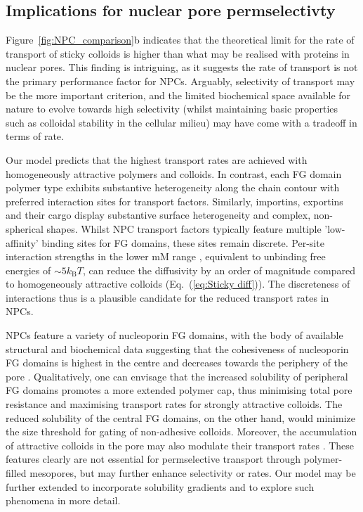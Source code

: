 \documentclass[12pt, a4paper]{article}
\begin{document}
\subsection{Implications for nuclear pore permselectivty}

Figure~\ref{fig:NPC_comparison}b indicates that the theoretical limit for the rate of transport of sticky colloids is higher than what may be realised with proteins in nuclear pores.
This finding is intriguing, as it suggests the rate of transport is not the primary performance factor for NPCs.
Arguably, selectivity of transport may be the more important criterion, and the limited biochemical space available for nature to evolve towards high selectivity (whilst maintaining basic properties such as colloidal stability in the cellular milieu) may have come with a tradeoff in terms of rate.

Our model predicts that the highest transport rates are achieved with homogeneously attractive polymers and colloids.
In contrast, each FG domain polymer type exhibits substantive heterogeneity along the chain contour with preferred interaction sites for transport factors.
Similarly, importins, exportins and their cargo display substantive surface heterogeneity and complex, non-spherical shapes.
Whilst NPC transport factors typically feature multiple 'low-affinity' binding sites for FG domains, these sites remain discrete.
Per-site interaction strengths in the lower mM range \cite{Hough2015, Milles2015, Hoogenboom2021}, equivalent to unbinding free energies of $\sim 5 k_\text{B}T$, can reduce the diffusivity by an order of magnitude compared to homogeneously attractive colloids (Eq.~(\ref{eq:Sticky diff})).
The discreteness of interactions thus is a plausible candidate for the reduced transport rates in NPCs. 

NPCs feature a variety of nucleoporin FG domains, with the body of available structural and biochemical data suggesting that the cohesiveness of nucleoporin FG domains is highest in the centre and decreases towards the periphery of the pore \cite{Hoogenboom2021, Ng2023}.
Qualitatively, one can envisage that the increased solubility of peripheral FG domains promotes a more extended polymer cap, thus minimising total pore resistance and maximising transport rates for strongly attractive colloids.
The reduced solubility of the central FG domains, on the other hand, would minimize the size threshold for gating of non-adhesive colloids.
Moreover, the accumulation of attractive colloids in the pore may also modulate their transport rates \cite{Zheng2023}.
These features clearly are not essential for permselective transport through polymer-filled mesopores, but may further enhance selectivity or rates.
Our model may be further extended to incorporate solubility gradients and to explore such phenomena in more detail.
\end{document}
